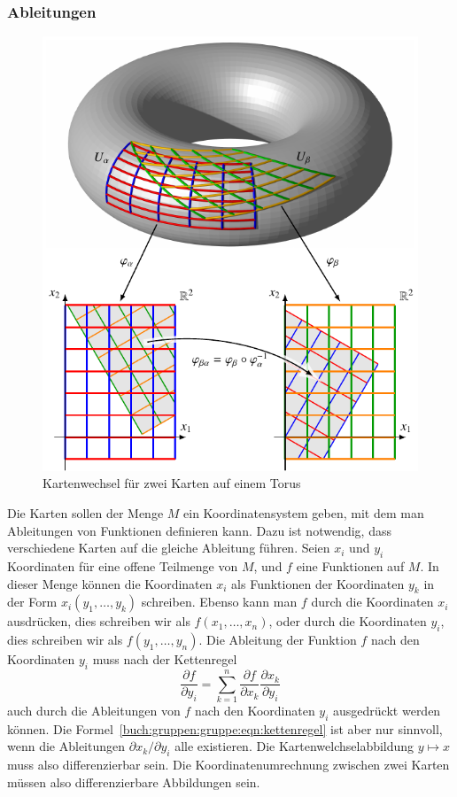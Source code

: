 %
%
\subsubsection{Ableitungen}
\begin{figure}
\centering
\includegraphics{chapters/030-gruppen/images/karten.pdf}
\caption{Kartenwechsel für zwei Karten auf einem Torus
\label{buch:gruppen:gruppe:fig:kartenwechsel}}
\end{figure}
Die Karten sollen der Menge $M$ ein Koordinatensystem geben, mit dem
man Ableitungen von Funktionen definieren kann.
Dazu ist notwendig, dass verschiedene Karten auf die gleiche
Ableitung führen.
Seien $x_i$ und $y_i$ Koordinaten für eine offene Teilmenge von $M$,
und $f$ eine Funktionen auf $M$.
In dieser Menge können die Koordinaten $x_i$ als Funktionen der 
Koordinaten $y_k$ in der Form $x_i(y_1,\dots,y_k)$ schreiben.
Ebenso kann man $f$ durch die Koordinaten $x_i$ ausdrücken, dies
schreiben wir als $f(x_1,\dots,x_n)$, oder durch die Koordinaten $y_i$,
dies schreiben wir als $f(y_1,\dots,y_n)$.
Die Ableitung der Funktion $f$ nach den Koordinaten $y_i$ muss nach
der Kettenregel
\begin{equation}
\frac{\partial f}{\partial y_i}
=
\sum_{k=1}^n
\frac{\partial f}{\partial x_k} \frac{\partial x_k}{\partial y_i}
\label{buch:gruppen:gruppe:eqn:kettenregel}
\end{equation}
auch durch die Ableitungen von $f$ nach den Koordinaten $y_i$
ausgedrückt werden können.
Die Formel~\ref{buch:gruppen:gruppe:eqn:kettenregel} ist aber nur sinnvoll,
wenn die Ableitungen $\partial x_k/\partial y_i$ alle existieren.
Die Kartenwelchselabbildung $y\mapsto x$ muss also differenzierbar sein.
Die Koordinatenumrechnung zwischen zwei Karten müssen also differenzierbare
Abbildungen sein.

